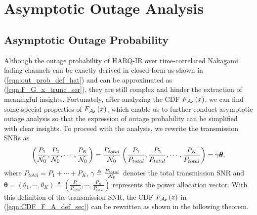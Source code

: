 \documentclass[12pt,onecolumn,draftcls]{IEEEtran}
\newcommand{\bs}{\boldsymbol}
\begin{document}
\section{Asymptotic Outage Analysis}\label{sec:asy}
\subsection{Asymptotic Outage Probability}
Although the outage probability of HARQ-IR over time-correlated Nakagami fading channels can be exactly derived in closed-form as shown in (\ref{eqn:out_prob_def_hat}) and can be approximated as (\ref{eqn:F_G_x_trunc_ser}), they are still complex and hinder the extraction of meaningful insights. Fortunately, after analyzing the CDF ${F_{{{ {\cal A}}_{\bs{\ell}}}}}\left( x \right)$, we can find some special properties of ${F_{{{ {\cal A}}_{\bs{\ell}}}}}\left( x \right)$, which enable us to further conduct asymptotic outage analysis so that the expression of outage probability can be simplified with clear insights. To proceed with the analysis, we rewrite the transmission SNRs as
\begin{equation}\label{eqn:gamma_snr_rel}
\left( {\frac{{{P_1}}}{{{{\cal N}_0}}},\frac{{{P_2}}}{{{{\cal N}_0}}}, \cdots ,\frac{{{P_K}}}{{{{\cal N}_0}}}} \right) = \frac{{{P_{total}}}}{{{{\cal N}_0}}}\left( {\frac{{{P_1}}}{{{P_{total}}}},\frac{{{P_2}}}{{{P_{total}}}}, \cdots ,\frac{{{P_K}}}{{{P_{total}}}}} \right) = \gamma \bs \theta,
\end{equation}
where ${P_{total}} = {P_1} +  \cdots  + {P_K}$, $\gamma \triangleq \frac{{{P_{total}}}}{{{{\cal N}_0}}}$ denotes the total transmission SNR and $\bs \theta = ({\theta_1},\cdots,{\theta_K})\triangleq\left( {\frac{{{P_1}}}{{{P_{total}}}}, \cdots ,\frac{{{P_K}}}{{{P_{total}}}}} \right)$ represents the power allocation vector. With this definition of the transmission SNR, the CDF ${F_{{{ {\cal A}}_{\bs{\ell}}}}}\left( x \right)$ in (\ref{eqn:CDF_F_A_def_sec}) can be rewritten as shown in the following theorem.
\end{document}
